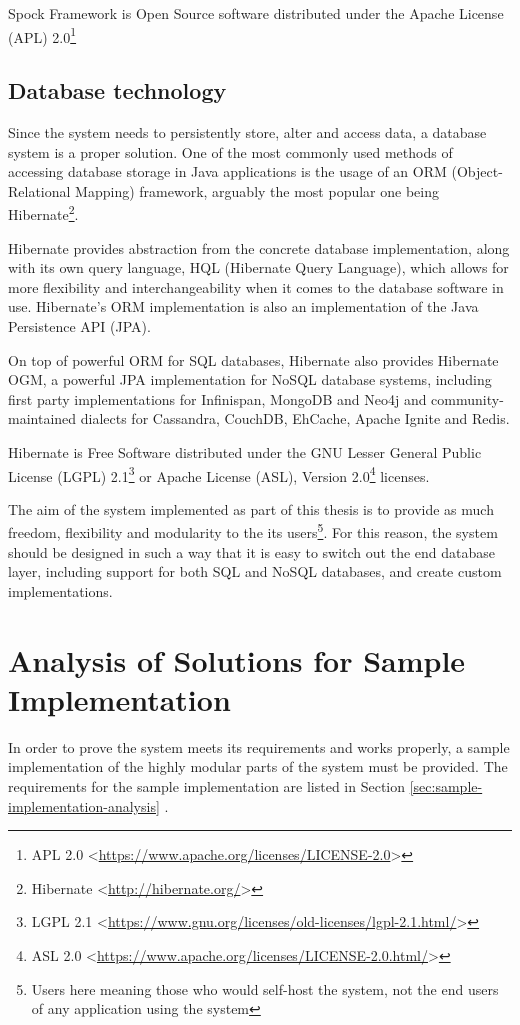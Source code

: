 Spock Framework is Open Source software distributed under the Apache License (APL) 2.0\footnote{APL 2.0 <\url{https://www.apache.org/licenses/LICENSE-2.0}>}

\subsection{Database technology}
Since the system needs to persistently store, alter and access data, a database system is a proper solution. One of the most commonly used methods of accessing database storage in Java applications is the usage of an ORM (Object-Relational Mapping) framework, arguably the most popular one being Hibernate\footnote{Hibernate <\url{http://hibernate.org/}>}.

Hibernate provides abstraction from the concrete database implementation, along with its own query language, HQL (Hibernate Query Language), which allows for more flexibility and interchangeability when it comes to the database software in use. Hibernate's ORM implementation is also an implementation of the Java Persistence API (JPA)\cite{hibernate-orm}.

On top of powerful ORM for SQL databases, Hibernate also provides Hibernate OGM, a powerful JPA implementation for NoSQL database systems, including first party implementations for Infinispan, MongoDB and Neo4j and community-maintained dialects for Cassandra, CouchDB, EhCache, Apache Ignite and Redis\cite{hibernate-ogm}.

Hibernate is Free Software distributed under the GNU Lesser General Public License (LGPL) 2.1\footnote{LGPL 2.1 <\url{https://www.gnu.org/licenses/old-licenses/lgpl-2.1.html/}>} or Apache License (ASL), Version 2.0\footnote{ASL 2.0 <\url{https://www.apache.org/licenses/LICENSE-2.0.html/}>} licenses.

The aim of the system implemented as part of this thesis is to provide as much freedom, flexibility and modularity to the its users\footnote{Users here meaning those who would self-host the system, not the end users of any application using the system}. For this reason, the system should be designed in such a way that it is easy to switch out the end database layer, including support for both SQL and NoSQL databases, and create custom implementations.

\section{Analysis of Solutions for Sample Implementation}
In order to prove the system meets its requirements and works properly, a sample implementation of the highly modular parts of the system must be provided. The requirements for the sample implementation are listed in Section \ref{sec:sample-implementation-analysis} .

